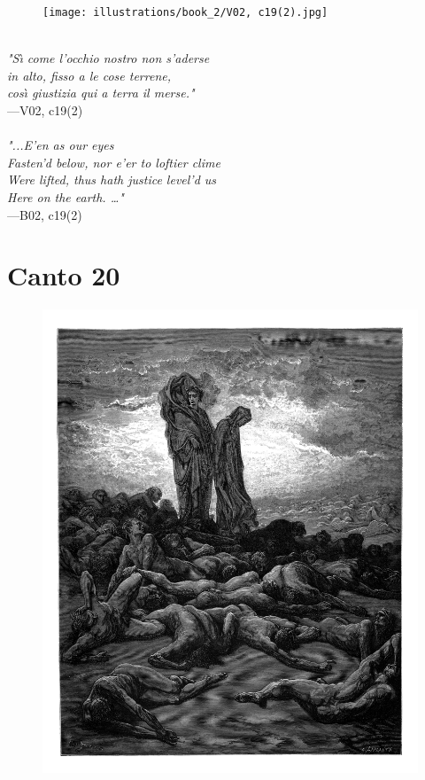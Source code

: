 \documentclass[../Dore_vision.tex]{subfiles}
\begin{document}
\begin{figure}[ht]
\centering
\texttt{[image: illustrations/book\_2/V02, c19(2).jpg]}
\end{figure}

\begin{center}
\begin{minipage}{0.8\linewidth}
\textit{\\
"S\`{\i} come l’occhio nostro non s’aderse\\in alto, fisso a le cose terrene,\\cos\`{\i} giustizia qui a terra il merse."} \\
—V02, c19(2) \\~\\
\textit{"...E'en as our eyes\\Fasten'd below, nor e'er to loftier clime\\Were lifted, thus hath justice level'd us\\Here on the earth. …"} \\
—B02, c19(2)
\end{minipage}
\end{center}

\newpage

\section{Canto 20}

\begin{figure}[ht]
\centering
\includegraphics[height=\figsize]{illustrations/book_2/V02, c20.jpg}
\end{figure}
\end{document}
